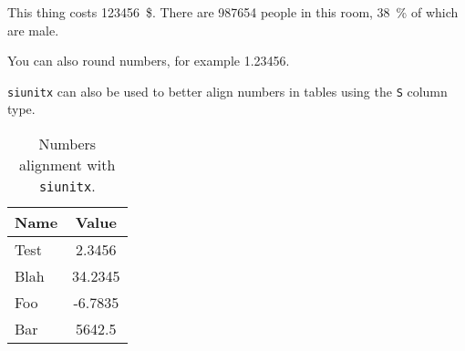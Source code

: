 \documentclass{article}
\begin{document}
This thing costs \SI{123456}{\$}.
There are \num{987654} people in this room, \SI{38}{\percent} of which are male.

\vspace{1cm}

%
You can also round numbers, for example \num{1.23456}.

\vspace{1cm}

\texttt{siunitx} can also be used to better align numbers in tables using the \texttt{S}
column type.

\begin{table}[h]
    \centering
    \begin{tabular}{lS}
        \toprule
        Name & {Value} \\ %
        \midrule
        Test & 2.3456 \\
        Blah & 34.2345 \\
        Foo & -6.7835 \\
        Bar & 5642.5 \\
        \bottomrule
    \end{tabular}
    \caption{Numbers alignment with \texttt{siunitx}.}
\end{table}
\end{document}
